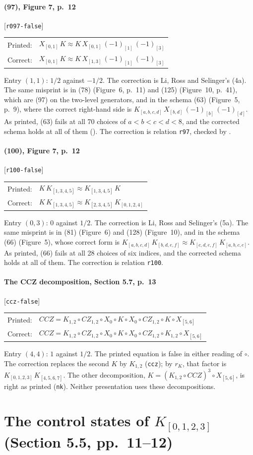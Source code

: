 \documentclass[11pt]{article}
\makeatletter
\newcommand{\Xa}[1]{X_{[#1]}}
\newcommand{\Ma}[1]{(-1)_{[#1]}}
\newcommand{\Ka}[1]{K_{[#1]}}
\newcommand{\CZ}{\mathit{CZ}}
\newcommand{\CCZ}{\mathit{CCZ}}
\newcommand{\rK}{r_K}
\newcommand{\agda}[1]{\texttt{#1}}
\newcommand{\file}[1]{\path{#1}}
\newcommand{\pc}[2]{\par\smallskip\noindent
  \begin{tabular}{@{\hspace{1.5em}}l@{\quad}l@{}}
    Printed: & $#1$ \\
    Correct: & $#2$
  \end{tabular}\par\smallskip\noindent\ignorespaces}
\makeatother
\begin{document}
\paragraph{(97), Figure 7, p.~12} [\agda{r097-false}]
\pc{\Xa{0,1}\,K\approx K\,\Xa{0,1}\,\Ma{1}\,\Ma{3}}
   {\Xa{0,1}\,K\approx K\,\Xa{1,3}\,\Ma{1}\,\Ma{3}}
Entry $(1,1)$: $1/2$ against $-1/2$. The correction is Li, Ross and
Selinger's (4a). The same misprint is in (78) (Figure~6, p.~11) and (125)
(Figure~10, p.~41), which are (97) on the two-level generators, and in the
schema (63) (Figure~5, p.~9), where the correct right-hand side is
$\Ka{a,b,c,d}\,\Xa{b,d}\,\Ma{b}\,\Ma{d}$. As printed, (63) fails at all 70
choices of $a<b<c<d<8$, and the corrected schema holds at all of them
(\file{gen/errata.py}). The correction is relation \agda{r97}, checked by
\file{Soundness.agda}.

\paragraph{(100), Figure 7, p.~12} [\agda{r100-false}]
\pc{K\,\Ka{1,3,4,5}\approx\Ka{1,3,4,5}\,K}
   {K\,\Ka{1,3,4,5}\approx\Ka{2,3,4,5}\,\Ka{0,1,2,4}}
Entry $(0,3)$: $0$ against $1/2$. The correction is Li, Ross and Selinger's
(5a). The same misprint is in (81) (Figure~6) and (128) (Figure~10), and in
the schema (66) (Figure~5), whose correct form is
$\Ka{a,b,c,d}\,\Ka{b,d,e,f}\approx\Ka{c,d,e,f}\,\Ka{a,b,c,e}$. As printed,
(66) fails at all 28 choices of six indices, and the corrected schema holds
at all of them. The correction is relation \agda{r100}.

\paragraph{The CCZ decomposition, Section 5.7, p.~13} [\agda{ccz-false}]
\pc{\CCZ = K_{1,2}\circ\CZ_{1,2}\circ X_0\circ K\circ X_0\circ\CZ_{1,2}
     \circ K\circ\Xa{5,6}}
   {\CCZ = K_{1,2}\circ\CZ_{1,2}\circ X_0\circ K\circ X_0\circ\CZ_{1,2}
     \circ K_{1,2}\circ\Xa{5,6}}
Entry $(4,4)$: $1$ against $1/2$. The printed equation is false in either
reading of $\circ$. The correction replaces the second $K$ by $K_{1,2}$
(\agda{ccz}); by $\rK$, that factor is $\Ka{0,1,2,3}\,\Ka{4,5,6,7}$. The
other decomposition, $K = (K_{1,2}\circ\CCZ)^3\circ\Xa{5,6}$, is right as
printed (\agda{nk}). Neither presentation uses these decompositions.

\section{The control states of \texorpdfstring{$K_{[0,1,2,3]}$}{K[0,1,2,3]}
(Section 5.5, pp.~11--12)}
\end{document}
